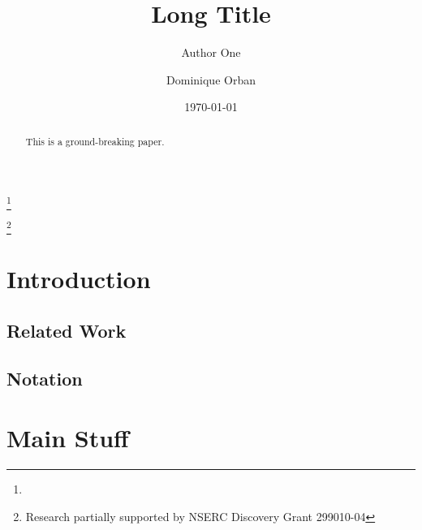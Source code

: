 \documentclass{amsart}
\begin{document}
\title[Short Title]{%
  Long Title
}

\author[A. One]{Author One}
\address{%
  Some Lab, Some Univeristy, Some Place
}
\thanks{}

\author[D. Orban]{Dominique Orban}
\address{%
  GERAD and
  Mathematics and Industrial Engineering Department \\
  \'Ecole Polytechnique, Montr\'eal, Canada
}
\thanks{Research partially supported by NSERC Discovery Grant 299010-04}



\date{\today}

\begin{abstract}
  This is a ground-breaking paper.
\end{abstract}

\maketitle

\pagestyle{myheadings}

\tableofcontents
\listoftodos\relax   %

\section{Introduction}

\subsection{Related Work}

\subsection{Notation}


\section{Main Stuff}
\end{document}
